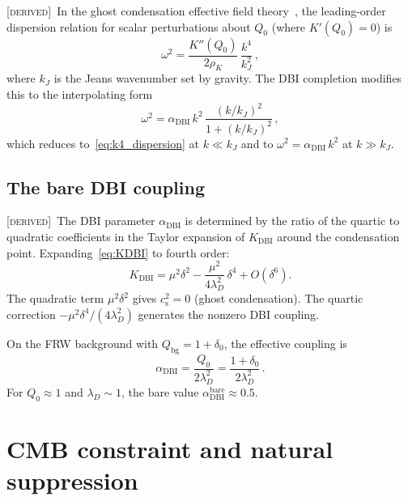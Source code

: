 \documentclass[prd,twocolumn,superscriptaddress,longbibliography,floatfix]{revtex4-2}
\newcommand{\cs}{c_{\mathrm{s}}}
\newcommand{\derived}{\textsc{[derived]}}
\begin{document}
\derived\ In the ghost condensation effective field
theory~\cite{AHCLM2004}, the leading-order dispersion
relation for scalar perturbations about $Q_0$ (where
$K'(Q_0) = 0$) is
\begin{equation}
\omega^2 = \frac{K''(Q_0)}{2\rho_K}\,
\frac{k^4}{k_J^2}\,,
\label{eq:k4_dispersion}
\end{equation}
where $k_J$ is the Jeans wavenumber set by gravity.
The DBI completion modifies this to the interpolating form
\begin{equation}
\omega^2 = \alpha_{\mathrm{DBI}}\,k^2\,
\frac{(k/k_J)^2}{1 + (k/k_J)^2}\,,
\label{eq:DBI_dispersion}
\end{equation}
which reduces to~\eqref{eq:k4_dispersion} at $k \ll k_J$
and to $\omega^2 = \alpha_{\mathrm{DBI}}\,k^2$ at
$k \gg k_J$.

\subsection{The bare DBI coupling}
\label{sec:bare}

\derived\ The DBI parameter $\alpha_{\mathrm{DBI}}$
is determined by the ratio of the quartic to quadratic
coefficients in the Taylor expansion of
$K_{\mathrm{DBI}}$ around the condensation point.
Expanding~\eqref{eq:KDBI} to fourth order:
\begin{equation}
K_{\mathrm{DBI}} = \mu^2\delta^2
- \frac{\mu^2}{4\lambda_D^2}\,\delta^4
+ O(\delta^6).
\label{eq:K_expansion}
\end{equation}
The quadratic term $\mu^2\delta^2$ gives
$\cs^2 = 0$ (ghost condensation).  The quartic
correction $-\mu^2\delta^4/(4\lambda_D^2)$ generates
the nonzero DBI coupling.

On the FRW background with $Q_{\mathrm{bg}} = 1 + \delta_0$,
the effective coupling is~\cite{BS2024,AHCLM2004}
\begin{equation}
\boxed{
\alpha_{\mathrm{DBI}} = \frac{Q_0}{2\lambda_D^2}
= \frac{1 + \delta_0}{2\lambda_D^2}\,.
}
\label{eq:alpha_bare}
\end{equation}
For $Q_0 \approx 1$ and $\lambda_D \sim 1$, the bare
value $\alpha_{\mathrm{DBI}}^{\mathrm{bare}} \approx 0.5$.


\section{CMB constraint and natural suppression}
\label{sec:constraint}
\end{document}
